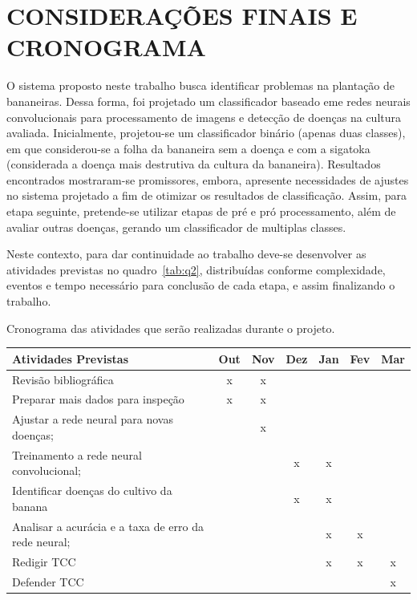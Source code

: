 \section{CONSIDERAÇÕES FINAIS E CRONOGRAMA}

O sistema proposto neste trabalho busca identificar problemas na plantação de bananeiras. Dessa forma, foi projetado um classificador baseado eme redes neurais convolucionais para processamento de imagens e detecção de doenças na cultura avaliada. Inicialmente,  projetou-se um classificador binário (apenas duas classes), em que considerou-se a folha da bananeira sem a doença e com a sigatoka (considerada a doença mais destrutiva da cultura da bananeira). Resultados encontrados mostraram-se promissores, embora, apresente necessidades de ajustes no sistema projetado a fim de otimizar os resultados de classificação. Assim, para etapa seguinte, pretende-se utilizar etapas de pré e pró processamento, além de avaliar outras doenças, gerando um classificador de multiplas classes. 

Neste contexto, para dar continuidade ao trabalho deve-se desenvolver as atividades previstas no quadro~\ref{tab:q2}, distribuídas conforme complexidade, eventos e tempo necessário para conclusão de cada etapa, e assim finalizando o trabalho. 


\begin{quadro}[!htb]
\caption{Cronograma das atividades que serão realizadas durante o projeto.}\label{tab:q2}
\centering
\begin{tabular}{|p{45 mm }|c|c|c|c|c|c|}

\hline \centering \textbf{\footnotesize Atividades Previstas}   & \textbf{\footnotesize Out}  & \textbf{\footnotesize Nov} & \textbf{\footnotesize Dez} & \textbf{\footnotesize Jan} & \textbf{\footnotesize Fev} & \textbf{\footnotesize Mar} \\
\hline  Revisão bibliográfica&   x & x &  &  & &    \\ 
\hline  Preparar mais dados para inspeção & x & x  &  &  &  &   \\ 
\hline Ajustar a rede neural para novas doenças;  &   &  x &  &  &  &\\ 
\hline  Treinamento a rede neural convolucional;   &  &  & x & x &  &  \\
\hline  Identificar doenças do cultivo da banana   &  &  & x & x &  &  \\ 
\hline Analisar a acurácia e a taxa de erro da rede neural;     &  &  &  & x & x &    \\ 
\hline  Redigir TCC   &  &  &  & x & x & x  \\
\hline  Defender TCC   &  &  &  &  &  & x  \\
\hline 
\end{tabular}
\end{quadro}


